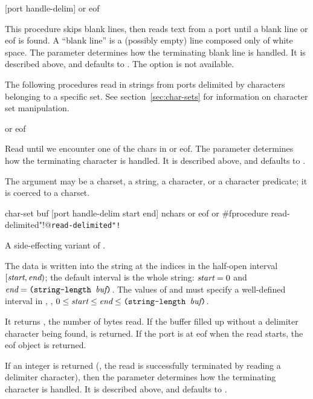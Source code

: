  {[port handle-delim]} {{\str} or eof}
\begin{desc}
    This procedure skips blank lines,
    then reads text from a port until a blank line or eof is found.
    A ``blank line'' is a (possibly empty) line composed only of white space.
    The  parameter determines how the terminating
    blank line is handled.
    It is described above, and defaults to .
    The  option is not available.
\end{desc}


The following procedures read in strings from ports delimited by characters
belonging to a specific set.
See section~\ref{sec:char-sets} for information on character set manipulation.

 {{\str} or eof}
\begin{desc}
    Read until we encounter one of the chars in  or eof.
    The  parameter determines how the terminating character
    is handled. It is described above, and defaults to .

    The  argument may be a charset, a string, a character, or a
    character predicate; it is coerced to a charset.
\end{desc}

 {char-set buf [port handle-delim start end]}
        {nchars or eof or \#f}{procedure}
        {read-delimited"!@\texttt{read-delimited"!}}
\begin{desc}
    A side-effecting variant of .
    
    The data is written into the string  at the indices in the
    half-open interval $[\var{start},\var{end})$; the default interval is the
    whole string: $\var{start}=0$ and $\var{end}=\ex{(string-length
    \var{buf})}$.  The values of  and  must specify a
    well-defined interval in , \ie, $0 \le \var{start} \le \var{end}
    \le \ex{(string-length \var{buf})}$.  

    It returns , the number of bytes read. If the buffer filled up
    without a delimiter character being found,  is returned. If
    the port is at eof when the read starts, the eof object is returned.

    If an integer is returned (\ie, the read is successfully terminated by
    reading a delimiter character), then the  parameter
    determines how the terminating character is handled. 
    It is described above, and defaults to .
\end{desc}



